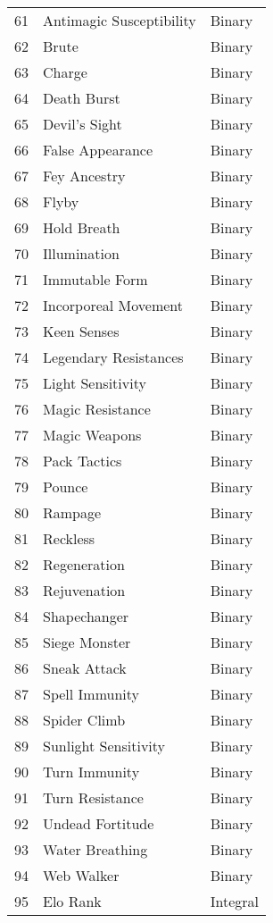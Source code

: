 \documentclass[12pt]{diazessay}
\begin{document}
\begin{table}[!htbp]
\begin{scriptsize}
\begin{minipage}[b]{0.45\linewidth}
\begin{longtable}{@{}rll@{}}
	61 & Antimagic Susceptibility & Binary \\
	62 & Brute & Binary \\
	63 & Charge & Binary \\
	64 & Death Burst & Binary \\
	65 & Devil's Sight & Binary \\
	66 & False Appearance & Binary \\
	67 & Fey Ancestry & Binary \\
	68 & Flyby & Binary \\
	69 & Hold Breath & Binary \\
	70 & Illumination & Binary \\
	71 & Immutable Form & Binary \\
	72 & Incorporeal Movement & Binary \\
	73 & Keen Senses & Binary \\
	74 & Legendary Resistances & Binary \\
	75 & Light Sensitivity & Binary \\
	76 & Magic Resistance & Binary \\
	77 & Magic Weapons & Binary \\
	78 & Pack Tactics & Binary \\
	79 & Pounce & Binary \\
	80 & Rampage & Binary \\
	81 & Reckless & Binary \\
	82 & Regeneration & Binary \\
	83 & Rejuvenation & Binary \\
	84 & Shapechanger & Binary \\
	85 & Siege Monster & Binary \\
	86 & Sneak Attack & Binary \\
	87 & Spell Immunity & Binary \\
	88 & Spider Climb & Binary \\
	89 & Sunlight Sensitivity & Binary \\
	90 & Turn Immunity & Binary \\
	91 & Turn Resistance & Binary \\
	92 & Undead Fortitude & Binary \\
	93 & Water Breathing & Binary \\
	94 & Web Walker & Binary \\
	95 & Elo Rank & Integral \\
	\bottomrule
\end{longtable}
\end{minipage}
\end{scriptsize}

\end{table}
\end{document}

